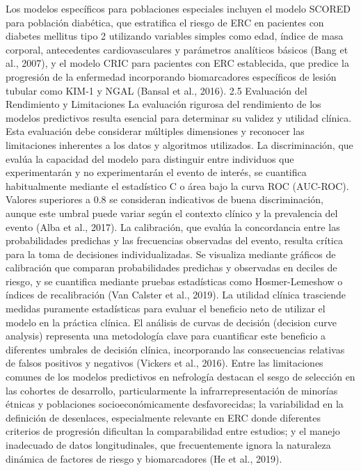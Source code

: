 \documentclass{article}
\begin{document}
\begin{multicols}{2}
Los modelos específicos para poblaciones especiales incluyen el modelo SCORED para población diabética, que estratifica el riesgo de ERC en pacientes con diabetes mellitus tipo 2 utilizando variables simples como edad, índice de masa corporal, antecedentes cardiovasculares y parámetros analíticos básicos (Bang et al., 2007), y el modelo CRIC para pacientes con ERC establecida, que predice la progresión de la enfermedad incorporando biomarcadores específicos de lesión tubular como KIM-1 y NGAL (Bansal et al., 2016).
 2.5 Evaluación del Rendimiento y Limitaciones
La evaluación rigurosa del rendimiento de los modelos predictivos resulta esencial para determinar su validez y utilidad clínica. Esta evaluación debe considerar múltiples dimensiones y reconocer las limitaciones inherentes a los datos y algoritmos utilizados.
La discriminación, que evalúa la capacidad del modelo para distinguir entre individuos que experimentarán y no experimentarán el evento de interés, se cuantifica habitualmente mediante el estadístico C o área bajo la curva ROC (AUC-ROC). Valores superiores a 0.8 se consideran indicativos de buena discriminación, aunque este umbral puede variar según el contexto clínico y la prevalencia del evento (Alba et al., 2017).
La calibración, que evalúa la concordancia entre las probabilidades predichas y las frecuencias observadas del evento, resulta crítica para la toma de decisiones individualizadas. Se visualiza mediante gráficos de calibración que comparan probabilidades predichas y observadas en deciles de riesgo, y se cuantifica mediante pruebas estadísticas como Hosmer-Lemeshow o índices de recalibración (Van Calster et al., 2019).
La utilidad clínica trasciende medidas puramente estadísticas para evaluar el beneficio neto de utilizar el modelo en la práctica clínica. El análisis de curvas de decisión (decision curve analysis) representa una metodología clave para cuantificar este beneficio a diferentes umbrales de decisión clínica, incorporando las consecuencias relativas de falsos positivos y negativos (Vickers et al., 2016).
Entre las limitaciones comunes de los modelos predictivos en nefrología destacan el sesgo de selección en las cohortes de desarrollo, particularmente la infrarrepresentación de minorías étnicas y poblaciones socioeconómicamente desfavorecidas; la variabilidad en la definición de desenlaces, especialmente relevante en ERC donde diferentes criterios de progresión dificultan la comparabilidad entre estudios; y el manejo inadecuado de datos longitudinales, que frecuentemente ignora la naturaleza dinámica de factores de riesgo y biomarcadores (He et al., 2019).

\end{multicols}
\end{document}
